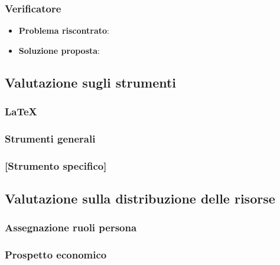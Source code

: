 		\subsubsection{Verificatore}
			\begin{itemize}
				\item \textbf{Problema riscontrato}:
				\item \textbf{Soluzione proposta}:
			\end{itemize}

	\subsection{Valutazione sugli strumenti}

		\subsubsection{\LaTeX}
		\subsubsection{Strumenti generali}
		\subsubsection{[Strumento specifico]}	
		
	\subsection{Valutazione sulla distribuzione delle risorse}
	
		\subsubsection{Assegnazione ruoli persona}
		\subsubsection{Prospetto economico}
		
